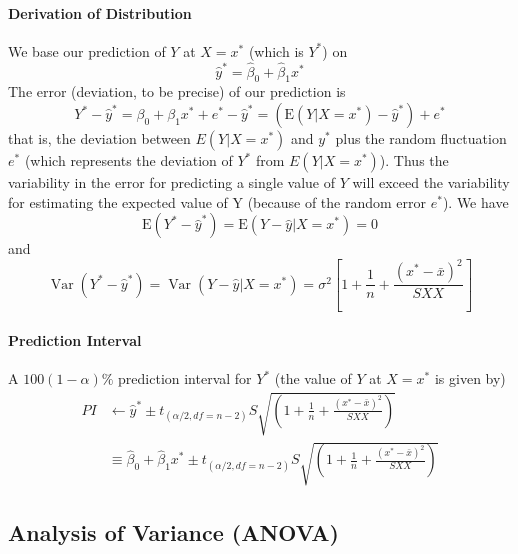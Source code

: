 \documentclass[11pt]{article}
\begin{document}
\paragraph{Derivation of Distribution}
We base our prediction of $Y$ at $X = x^*$ (which is $Y^*$) on
\begin{equation*}
    \hat{y}^{*}=\hat{\beta}_{0}+\hat{\beta}_{1} x^{*}
\end{equation*}
The error (deviation, to be precise) of our prediction is 
\begin{equation*}
    Y^{*}-\hat{y}^{*}=\beta_{0}+\beta_{1} x^{*}+e^{*}-\hat{y}^{*}= \left(\mathrm{E}\left(Y | X=x^{*}\right)- \hat{y}^{*} \right) + e^{*}
\end{equation*}
that is, the deviation between $E(Y | X = x^*)$ and $y^*$ plus the random fluctuation $e^*$ (which represents the deviation of $Y^*$ from $E(Y|X = x^*)$). Thus the variability in the error for predicting a single value of $Y$ will exceed the variability for estimating the expected value of Y (because of the random error $e^*$). We have
\begin{equation*}
    \mathrm{E}\left(Y^{*}-\hat{y}^{*}\right)=\mathrm{E}\left(Y-\hat{y} | X=x^{*}\right)=0
\end{equation*}
and
\begin{equation*}
    \operatorname{Var}\left(Y^{*}-\hat{y}^{*}\right)=\operatorname{Var}\left(Y-\hat{y} | X=x^{*}\right)=\sigma^{2}\left[1+\frac{1}{n}+\frac{\left(x^{*}-\bar{x}\right)^{2}}{S X X}\right]
\end{equation*}

\paragraph{Prediction Interval}
A $100 (1 - \alpha)\%$ prediction interval for $Y^*$ (the value of $Y$  at $X = x^*$ is given by)
\begin{align*}
    PI &\gets \hat{y}^{*} \pm t_{(\alpha / 2, df = n-2)} S \sqrt{\left(1+\frac{1}{n}+\frac{\left(x^{*}-\bar{x}\right)^{2}}{S X X}\right)} \\
    &\equiv \hat{\beta}_{0}+\hat{\beta}_{1} x^{*} \pm t_{(\alpha / 2, df = n-2)} S \sqrt{\left(1+\frac{1}{n}+\frac{\left(x^{*}-\bar{x}\right)^{2}}{S X X}\right)}
\end{align*}

\subsection{Analysis of Variance (ANOVA)}
\end{document}
